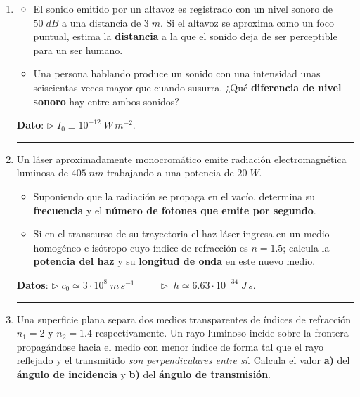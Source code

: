 \documentclass[a4paper,12pt]{exam}
\newcommand{\halmos}{\vspace*{-7mm}
	
					\begin{flushright}
						\rule{1mm}{2.5mm} 
					\end{flushright}\vspace*{-6mm}
						
					  }
\renewcommand{\qed}{\halmos}
\begin{document}
\begin{enumerate}
		
		\item 
			\begin{itemize}
				\item[a)] El sonido emitido por un altavoz es registrado con un nivel sonoro de $50\;dB$ a una 
distancia de $3\;m$. Si el altavoz se aproxima como un foco puntual, estima la \textbf{distancia} a la que el sonido deja de ser perceptible para un ser humano.

				\item[b)] Una persona hablando produce un sonido con una intensidad unas seiscientas veces mayor que 						cuando susurra. ¿Qué \textbf{diferencia de nivel sonoro} hay entre ambos sonidos?
				\vspace*{.2mm}					
			\end{itemize}
			\begin{footnotesize} 
            	\textbf{Dato}: \hspace*{2ex} $\triangleright\;I_0\equiv 10^{-12}\;W\,m^{-2}$.			\end{footnotesize}
		\qed
		\vspace{2ex}


		

		\item 	Un láser aproximadamente monocromático emite radiación electromagnética luminosa de $405\;nm$ trabajando a una potencia de $20\;W$. 
			\begin{itemize}
				\item[a)] Suponiendo que la radiación se propaga en el vacío, determina su \textbf{frecuencia} y el \textbf{número de fotones que emite por segundo}.
				\item[b)] Si en el transcurso de su trayectoria el haz láser ingresa en un medio homogéneo e isótropo cuyo índice de refracción es $n=1.5$; calcula la \textbf{potencia del haz} y su \textbf{longitud de onda} en este nuevo medio.
			\end{itemize}
			\begin{footnotesize} 
            	\textbf{Datos}: \hspace*{2ex} $\triangleright\;c_0\simeq 3\cdot 10^8\;m\,s^{-1}\hspace{1cm}\triangleright\;h\simeq 6.63\cdot 10^{-34}\;J\,s.$			
            \end{footnotesize}
			\qed
	\vspace{2ex}



\item Una superficie plana separa dos medios transparentes de índices de refracción $n_1
=2$ y $n_2 =1.4$ respectivamente. Un rayo luminoso incide sobre la frontera propagándose hacia el medio con menor índice  de forma tal que el rayo reflejado y el transmitido \textit{son perpendiculares entre sí}.  Calcula el valor  \textbf{a)} del \textbf{ángulo de incidencia} y \textbf{b)} del \textbf{ángulo de transmisión}.
		\qed
		

\end{enumerate}
\end{document}
